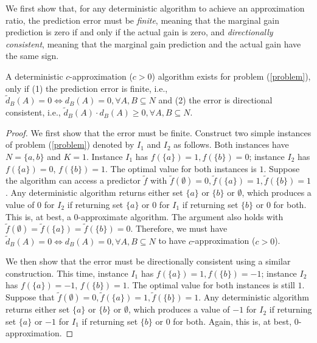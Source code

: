 We first show that, for any deterministic algorithm to achieve an approximation ratio, the prediction error must be \textit{finite}, meaning that the marginal gain prediction is zero if and only if the actual gain is zero, and \textit{directionally consistent}, meaning that the marginal gain prediction and the actual gain have the same sign. 
\begin{lemma}  \label{lem:necessity-of-error-properties}
A deterministic $c$-approximation ($c > 0$) algorithm exists for problem (\ref{problem}), only if (1) the prediction error is finite, i.e., $\tilde{d}_B(A) = 0 \iff {d}_B(A) = 0, \forall A, B \subseteq N$ and (2) the error is directional consistent, i.e., $\tilde{d}_B(A) \cdot {d}_B(A) \geq 0, \forall A, B \subseteq N$.
\end{lemma} 
\begin{proof}
We first show that the error must be finite. Construct two simple instances of problem (\ref{problem}) denoted by $I_1$ and $I_2$ as follows. Both instances have $N = \{ a, b \}$ and $K = 1$. Instance $I_1$ has $f(\{a\}) = 1, f(\{b\}) = 0$; instance $I_2$ has $f(\{ a \}) = 0$, $f(\{ b \}) = 1$. The optimal value for both instances is $1$. Suppose the algorithm can access a predictor $\tilde{f}$ with $\tilde{f}(\emptyset) = 0, \tilde{f}(\{a\}) = 1, \tilde{f}(\{b\}) = 1$. Any deterministic algorithm returns either set $\{ a \}$ or $\{ b \}$ or $\emptyset$, which produces a value of $0$ for $I_2$ if returning set $\{ a \}$ or $0$ for $I_1$ if returning set $\{ b \}$ or $0$ for both. This is, at best, a $0$-approximate algorithm. The argument also holds with $\tilde{f}(\emptyset) = \tilde{f}(\{a\}) = \tilde{f}(\{b\}) = 0$. Therefore, we must have $\tilde{d}_B(A) = 0 \iff {d}_B(A) = 0, \forall A, B \subseteq N$ to have $c$-approximation ($c > 0$). 

We then show that the error must be directionally consistent using a similar construction. This time, instance $I_1$ has $f(\{a\}) = 1, f(\{b\}) = -1$; instance $I_2$ has $f(\{ a \}) = -1$, $f(\{ b \}) = 1$. The optimal value for both instances is still $1$. Suppose that $\tilde{f}(\emptyset) = 0, \tilde{f}(\{a\}) = 1, \tilde{f}(\{b\}) = 1$. Any deterministic algorithm returns either set $\{ a \}$ or $\{ b \}$ or $\emptyset$, which produces a value of $-1$ for $I_2$ if returning set $\{ a \}$ or $-1$ for $I_1$ if returning set $\{ b \}$ or $0$ for both. Again, this is, at best, $0$-approximation. 
\end{proof}


